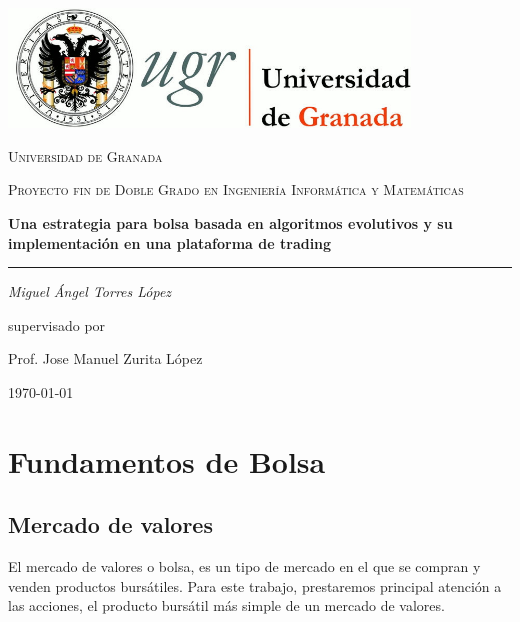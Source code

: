 \documentclass[12pt,a4paper]{article}
\begin{document}
		\afterpage{\null\newpage}
		\newpage
	
	\begin{titlepage}
		\centering
		\includegraphics[width=0.8\textwidth]{imagenes/logo_ugr.jpg}\par\vspace{1cm}
		{\scshape\LARGE Universidad de Granada \par}
		\vspace{1cm}
		{\scshape\Large Proyecto fin de Doble Grado en Ingenier\'ia Inform\'atica y Matem\'aticas\par}
		\vspace{1.5cm}
		{\huge\bfseries Una estrategia para bolsa basada en algoritmos evolutivos y su implementaci\'on en una plataforma de trading\par}
		\vspace{0.2cm}
		\noindent\rule{\textwidth}{1pt}
		\vspace{2cm}
		{\Large\itshape Miguel \'Angel Torres L\'opez\par}
		\vfill
		supervisado por\par
		{\large Prof. Jose Manuel Zurita L\'opez}
		
		\vfill
		
		{\large \today\par}
			
	\end{titlepage}
	
	\afterpage{\null\newpage}
	\newpage
	
	\tableofcontents
	
	\newpage
	
	\section{Fundamentos de Bolsa}
	
		\subsection{Mercado de valores}
		
		El mercado de valores o bolsa, es un tipo de mercado en el que se compran y venden productos burs\'atiles. Para este trabajo, prestaremos principal atenci\'on a las acciones, el producto burs\'atil m\'as simple de un mercado de valores.
		
\end{document}
